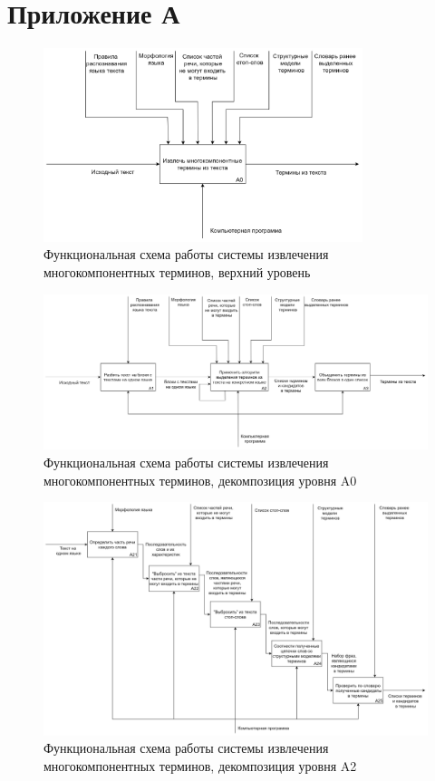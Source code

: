 \section*{Приложение А}

\begin{figure}
	\centering
	\includegraphics[width=0.83\textwidth ]{img/IDEF0/A0.png}
	\caption{Функциональная схема работы системы извлечения многокомпонентных терминов, верхний уровень}
\end{figure} 

\begin{figure}
	\centering
	\includegraphics[width=\textwidth ]{img/IDEF0/A0_decomposition.png}
	\caption{Функциональная схема работы системы извлечения многокомпонентных терминов, декомпозиция уровня A0}
\end{figure} 

\begin{figure}
	\centering
	\includegraphics[width=\textwidth ]{img/IDEF0/A2_decomposition.png}
	\caption{Функциональная схема работы системы извлечения многокомпонентных терминов, декомпозиция уровня A2}
\end{figure} 

\pagebreak
